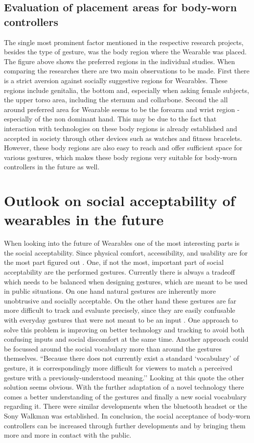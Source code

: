 \documentclass{sigchi}
\begin{document}
\subsection{Evaluation of placement areas for body-worn controllers }
The single most prominent factor mentioned in the respective research projects, besides the type of gesture, was the body region where the Wearable was placed. The figure above shows the preferred regions in the individual studies. When comparing the researches there are two main observations to be made. First there is a strict aversion against socially suggestive regions for Wearables. These regions include genitalia, the bottom and, especially when asking female subjects, the upper torso area, including the sternum and collarbone.
Second the all around preferred area for Wearable seems to be the forearm and wrist region - especially of the non dominant hand. \cite{touch-wrist,pinstripe,social-comfort,belt} %
This may be due to the fact that interaction with technologies on these body regions is already established and accepted in society through other devices such as watches and fitness bracelets. However, these body regions are also easy to reach and offer sufficient space for various gestures, which makes these body regions very suitable for body-worn controllers in the future as well.
\section{Outlook on social acceptability of wearables in the future}
When looking into the future of Wearables one of the most interesting parts is the social acceptability. Since physical comfort, accessibility, and usability are for the most part figured out \cite{social-comfort}.
One, if not the most, important part of social acceptability are the performed gestures. Currently there is always a tradeoff which needs to be balanced when designing gestures, which are meant to be used in public situations. On one hand natural gestures are inherently more unobtrusive and socially acceptable. On the other hand these gestures are far more difficult to track and evaluate precisely, since they are easily confusable with everyday gestures that were not meant to be an input \cite{social-comfort}.
One approach to solve this problem is improving on better technology and tracking to avoid both confusing inputs and social discomfort at the same time. Another approach could be focussed around the social vocabulary more than around the gestures themselves.
``Because there does not currently exist a standard `vocabulary’ of gesture, it is correspondingly more difficult for viewers to match a perceived gesture with a previously-understood meaning.'' \cite[p. 4160]{social-comfort} %
Looking at this quote the other solution seems obvious. With the further adaptation of a novel technology there comes a better understanding of the gestures and finally a new social vocabulary regarding it. There were similar developments when the bluetooth headset \cite{social-comfort} or the Sony Walkman \cite{touch-wrist} was established.
In conclusion, the social acceptance of body-worn controllers can be increased through further developments and by bringing them more and more in contact with the public.

% 


\end{document}
